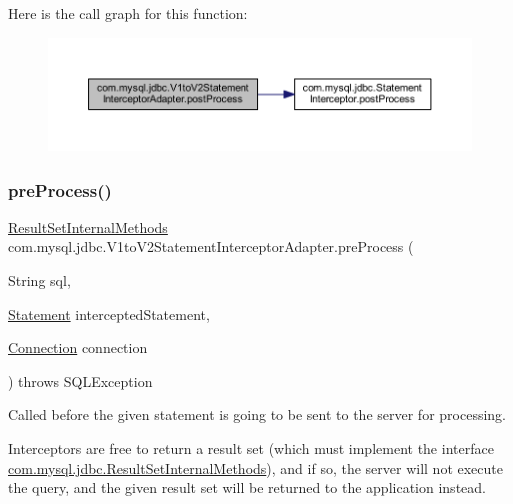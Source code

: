 Here is the call graph for this function\+:
\nopagebreak
\begin{figure}[H]
\begin{center}
\leavevmode
\includegraphics[width=350pt]{classcom_1_1mysql_1_1jdbc_1_1_v1to_v2_statement_interceptor_adapter_ab1a3f9ab0d2156eb2fbe442e39354ece_cgraph}
\end{center}
\end{figure}
\mbox{\label{classcom_1_1mysql_1_1jdbc_1_1_v1to_v2_statement_interceptor_adapter_a51a9e9ad7779917b8755806589849559}} 
\subsubsection{\texorpdfstring{pre\+Process()}{preProcess()}}
{\footnotesize\ttfamily \mbox{\hyperlink{interfacecom_1_1mysql_1_1jdbc_1_1_result_set_internal_methods}{Result\+Set\+Internal\+Methods}} com.\+mysql.\+jdbc.\+V1to\+V2\+Statement\+Interceptor\+Adapter.\+pre\+Process (\begin{DoxyParamCaption}\item[{String}]{sql,  }\item[{\mbox{\hyperlink{interfacecom_1_1mysql_1_1jdbc_1_1_statement}{Statement}}}]{intercepted\+Statement,  }\item[{\mbox{\hyperlink{interfacecom_1_1mysql_1_1jdbc_1_1_connection}{Connection}}}]{connection }\end{DoxyParamCaption}) throws S\+Q\+L\+Exception}

Called before the given statement is going to be sent to the server for processing.

Interceptors are free to return a result set (which must implement the interface \mbox{\hyperlink{interfacecom_1_1mysql_1_1jdbc_1_1_result_set_internal_methods}{com.\+mysql.\+jdbc.\+Result\+Set\+Internal\+Methods}}), and if so, the server will not execute the query, and the given result set will be returned to the application instead.


